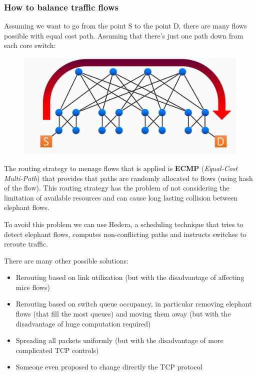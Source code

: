     \subsubsection{How to balance traffic flows}
        Assuming we want to go from the point S to the point D, there are many flows possible with equal cost path. Assuming that there's just one path down from each core switch:
        \begin{figure}[h!]
            \centering
            \includegraphics[scale=0.15]{images/trafficflow1.png}
        \end{figure}   
        
        The routing strategy to menage flows that is applied is \textbf{ECMP} (\textit{Equal-Cost Multi-Path}) that provides that paths are randomly allocated to flows (using hash of the flow).
        This routing strategy has the problem of not considering the limitation of available resources and can cause long lasting collision between elephant flows.
        
        To avoid this problem we can use Hedera, a scheduling technique that tries to detect elephant flows, computes non-conflicting paths and instructs switches to reroute traffic.
        
        There are many other possible solutions:
        \begin{itemize}
            \item Rerouting based on link utilization (but with the disadvantage of affecting mice flows)
            \item Rerouting based on switch queue occupancy, in particular removing elephant flows (that fill the most queues) and moving them away (but with the disadvantage of huge computation required)
            \item Spreading all packets uniformly (but with the disadvantage of more complicated TCP controls)
            \item Someone even proposed to change directly the TCP protocol
        \end{itemize}

